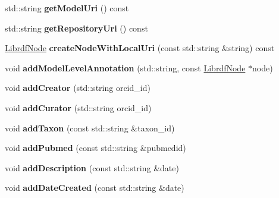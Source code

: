 \begin{DoxyCompactItemize}
std\+::string {\bfseries get\+Model\+Uri} () const
\item 
\mbox{\label{classomexmeta_1_1Editor_a2264cbd2efae17d1d72c3f402d8721bf}} 
std\+::string {\bfseries get\+Repository\+Uri} () const
\item 
\mbox{\label{classomexmeta_1_1Editor_a978e773a7c9c4f602bd3ce0d0672fda8}} 
\hyperlink{classredland_1_1LibrdfNode}{Librdf\+Node} {\bfseries create\+Node\+With\+Local\+Uri} (const std\+::string \&string) const
\item 
\mbox{\label{classomexmeta_1_1Editor_afc125a3de8d0795c4220681f04d0a657}} 
void {\bfseries add\+Model\+Level\+Annotation} (std\+::string, const \hyperlink{classredland_1_1LibrdfNode}{Librdf\+Node} $\ast$node)
\item 
\mbox{\label{classomexmeta_1_1Editor_a9c8b060005146f3cf5a231ea6789e7d7}} 
void {\bfseries add\+Creator} (std\+::string orcid\+\_\+id)
\item 
\mbox{\label{classomexmeta_1_1Editor_a8b83488faf68546733114acf54595b02}} 
void {\bfseries add\+Curator} (std\+::string orcid\+\_\+id)
\item 
\mbox{\label{classomexmeta_1_1Editor_af64f0cac6b7e27b121df94ab5b1fa217}} 
void {\bfseries add\+Taxon} (const std\+::string \&taxon\+\_\+id)
\item 
\mbox{\label{classomexmeta_1_1Editor_a533f93c8ae0c3081dfe2fc8e8ebee8ea}} 
void {\bfseries add\+Pubmed} (const std\+::string \&pubmedid)
\item 
\mbox{\label{classomexmeta_1_1Editor_a8526a87544b1265695f1749100da5fa2}} 
void {\bfseries add\+Description} (const std\+::string \&date)
\item 
\mbox{\label{classomexmeta_1_1Editor_ae1b146f142ec10237f8edbecf0368f8e}} 
void {\bfseries add\+Date\+Created} (const std\+::string \&date)
\item 
\mbox{\label{classomexmeta_1_1Editor_a50674b2591d2fed572954ac8490ee21c}} 

\end{DoxyCompactItemize}
